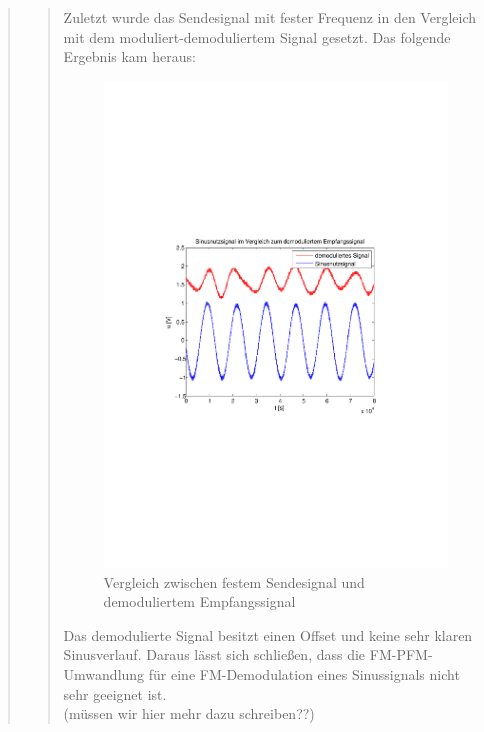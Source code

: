 \begin{quote}
\begin{quote}
          Zuletzt wurde das Sendesignal mit fester Frequenz in den Vergleich mit
          dem moduliert-demoduliertem Signal gesetzt. Das folgende Ergebnis kam
          heraus:
          
           
             \begin{figure}[H] \centering
                    \includegraphics[scale=0.5, trim = 2cm 6.5cm 1.5cm 8.5cm,
                    clip]{./Bilder/sinus_fm_demod}
                        \caption{Vergleich zwischen festem Sendesignal und
                        demoduliertem Empfangssignal}
                \end{figure}
          
        Das demodulierte Signal besitzt einen Offset und keine sehr klaren
        Sinusverlauf. Daraus lässt sich schließen, dass die FM-PFM-Umwandlung
        für eine FM-Demodulation eines Sinussignals nicht sehr geeignet ist.\\
        (müssen wir hier mehr dazu schreiben??)
    \end{quote}	
\end{quote}

